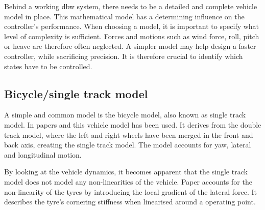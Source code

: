 \documentclass[conference]{IEEEtran}
\begin{document}
Behind a working dbw system, there needs to be a detailed and complete vehicle model in place. This mathematical model has a determining influence on the controller's performance. When choosing a model, it is important to specify what level of complexity is sufficient. Forces and motions such as wind force, roll, pitch or heave are therefore often neglected. A simpler model may help design a faster controller, while sacrificing precision. It is therefore crucial to identify which states have to be controlled. 

\subsection{Bicycle/single track model}
A simple and common model is the bicycle model, also known as single track model. In papers \cite{Zheng} and \cite{vandersande} this vehicle model has been used. It derives from the double track model, where the left and right wheels have been merged in the front and back axis, creating the single track model. The model accounts for yaw, lateral and longitudinal motion. 

%	
%
%
%
%

By looking at the vehicle dynamics, it becomes apparent that the single track model does not model any non-linearities of the vehicle. Paper \cite{vandersande} accounts for the non-linearity of the tyres by introducing the local gradient of the lateral force. It describes the tyre's cornering stiffness when linearised around a operating point.
\end{document}

